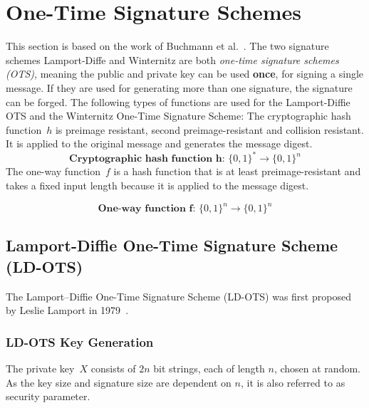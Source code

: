 \section{One-Time Signature Schemes}
\label{sec:one-time_sign_schemes}
This section is based on the work of Buchmann et al.~\cite{book_pqc_bernstein_2004}. 
The two signature schemes Lamport-Diffe and Winternitz are both \textit{one-time signature schemes (OTS)}, meaning the public and private key can be used \textbf{once}, for signing a single message. If they are used for generating more than one signature, the signature can be forged. %
The following types of functions are used for the Lamport-Diffie OTS and the Winternitz One-Time Signature Scheme: 
The cryptographic hash function~$h$ is preimage resistant, second preimage-resistant and collision resistant. It is applied to the original message and generates the message digest.
\begin{equation}
\label{eq:basic_hashfunc}
\textbf{Cryptographic hash function h: } \lbrace 0,1 \rbrace^* \rightarrow \lbrace 0,1 \rbrace^n
\end{equation}
The one-way function~$f$ is a hash function that is at least preimage-resistant and takes a fixed input length because it is applied to the message digest. 

\begin{equation}
\label{eq:one-way-func}
\textbf{One-way function f: } \lbrace 0,1 \rbrace^n \rightarrow \lbrace 0,1 \rbrace ^n
\end{equation}

\subsection{Lamport-Diffie One-Time Signature Scheme (LD-OTS)}
\label{sec:lamport_diffie_ots}
The Lamport–Diffie One-Time Signature Scheme (LD-OTS) was first proposed by Leslie Lamport in 1979~\cite{lamport_signature_scheme_1979}. 

\subsubsection{LD-OTS Key Generation}
The private key~$X$ consists of $2n$ bit strings, each of length $n$, chosen at random. As the key size and signature size are dependent on $n$, it is also referred to as security parameter.

